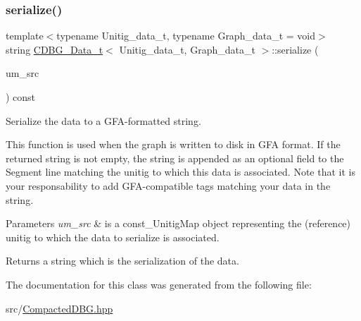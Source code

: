 \subsubsection{\texorpdfstring{serialize()}{serialize()}}
{\footnotesize\ttfamily template$<$typename Unitig\+\_\+data\+\_\+t, typename Graph\+\_\+data\+\_\+t = void$>$ \\
string \hyperlink{classCDBG__Data__t}{C\+D\+B\+G\+\_\+\+Data\+\_\+t}$<$ Unitig\+\_\+data\+\_\+t, Graph\+\_\+data\+\_\+t $>$\+::serialize (\begin{DoxyParamCaption}\item[{const \hyperlink{CompactedDBG_8hpp_a631369597e56604279ba89a211c14fd0}{const\+\_\+\+Unitig\+Map}$<$ Unitig\+\_\+data\+\_\+t, Graph\+\_\+data\+\_\+t $>$ \&}]{um\+\_\+src }\end{DoxyParamCaption}) const\hspace{0.3cm}{\ttfamily [inline]}}



Serialize the data to a G\+F\+A-\/formatted string. 

This function is used when the graph is written to disk in G\+FA format. If the returned string is not empty, the string is appended as an optional field to the Segment line matching the unitig to which this data is associated. Note that it is your responsability to add G\+F\+A-\/compatible tags matching your data in the string. 
\begin{DoxyParams}{Parameters}
{\em um\+\_\+src} & is a const\+\_\+\+Unitig\+Map object representing the (reference) unitig to which the data to serialize is associated. \\
\hline
\end{DoxyParams}
\begin{DoxyReturn}{Returns}
a string which is the serialization of the data. 
\end{DoxyReturn}


The documentation for this class was generated from the following file\+:\begin{DoxyCompactItemize}
\item 
src/\hyperlink{CompactedDBG_8hpp}{Compacted\+D\+B\+G.\+hpp}\end{DoxyCompactItemize}
